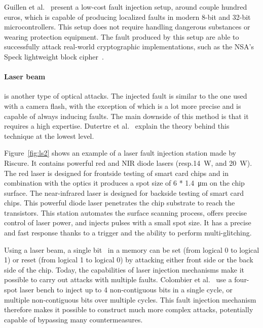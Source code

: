 Guillen et al.~\cite{GGD-17-cosade} present a low-cost fault injection setup, around couple hundred euros, which is capable of producing localized faults in modern 8-bit and 32-bit microcontrollers. This setup does not require handling dangerous substances or wearing protection equipment. The fault produced by this setup are able to successfully attack real-world cryptographic implementations, such as the NSA’s Speck lightweight block cipher~\cite{RDJSBL-13-nsa}.

\paragraph{Laser beam} is another type of optical attacks.
The injected fault is similar to the one used with a camera flash, with the exception of which is a lot more precise and is capable of always inducing faults.
The main downside of this method is that it requires a high expertise.
Dutertre et al.~\cite{DBCDFFGHLMDPR-18-fdtc} explain the theory behind this technique at the lowest level.

Figure~\ref{fig:ls2} shows an example of a laser fault injection station made by Riscure.
It contains powerful red and NIR diode lasers (resp.\SI{14}{\watt}, and \SI{20}{\watt}). The red laser is designed for frontside testing of smart card chips and in combination with the optics it produces a spot size of 6 * \SI{1.4}{\micro\metre} on the chip surface. The near-infrared laser is designed for backside testing of smart card chips. This powerful diode laser penetrates the chip substrate to reach the transistors.
This station automates the surface scanning process, offers precise control of laser power, and injects pulses with a small spot size. It has a precise and fast response thanks to a trigger and the ability to perform multi-glitching.

Using a laser beam, a single bit~\cite{CMDMRD-19-host} in a memory can be set (from logical 0 to logical 1) or reset (from logical 1 to logical 0) by attacking either front side or the back side of the chip.
Today, the capabilities of laser injection mechanisms make it possible to carry out attacks with multiple faults.
Colombier et al.~\cite{CGVCBLC-22-cardis} use a four-spot laser bench to inject up to 4 non-contiguous bits in a single cycle, or multiple non-contiguous bits over multiple cycles. This fault injection mechanism therefore makes it possible to construct much more complex attacks, potentially capable of bypassing many countermeasures.


